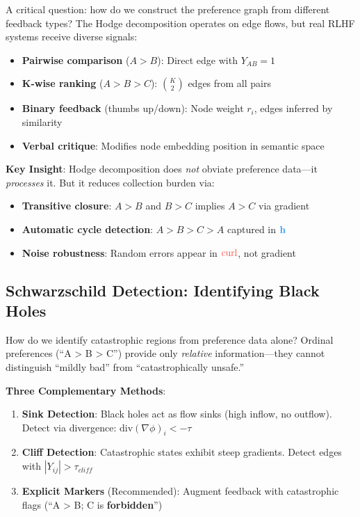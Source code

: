 \documentclass{article}
\begin{document}
A critical question: how do we construct the preference graph from different feedback types? The Hodge decomposition operates on edge flows, but real RLHF systems receive diverse signals:

\begin{itemize}[leftmargin=*]
    \item \textbf{Pairwise comparison} ($A > B$): Direct edge with $Y_{AB} = 1$
    \item \textbf{K-wise ranking} ($A > B > C$): $\binom{K}{2}$ edges from all pairs
    \item \textbf{Binary feedback} (thumbs up/down): Node weight $r_i$, edges inferred by similarity
    \item \textbf{Verbal critique}: Modifies node embedding position in semantic space
\end{itemize}

\textbf{Key Insight}: Hodge decomposition does \emph{not} obviate preference data---it \emph{processes} it. But it reduces collection burden via:
\begin{itemize}[leftmargin=*]
    \item \textbf{Transitive closure}: $A > B$ and $B > C$ implies $A > C$ via gradient
    \item \textbf{Automatic cycle detection}: $A > B > C > A$ captured in $\textcolor{harmcolor}{\mathbf{h}}$
    \item \textbf{Noise robustness}: Random errors appear in $\textcolor{curlcolor}{\text{curl}}$, not gradient
\end{itemize}

\subsection{Schwarzschild Detection: Identifying Black Holes}

How do we identify catastrophic regions from preference data alone? Ordinal preferences (``A > B > C'') provide only \emph{relative} information---they cannot distinguish ``mildly bad'' from ``catastrophically unsafe.''

\textbf{Three Complementary Methods}:

\begin{enumerate}[leftmargin=*]
    \item \textbf{Sink Detection}: Black holes act as flow sinks (high inflow, no outflow). Detect via divergence: $\text{div}(\nabla\phi)_i < -\tau$
    
    \item \textbf{Cliff Detection}: Catastrophic states exhibit steep gradients. Detect edges with $|Y_{ij}| > \tau_{cliff}$
    
    \item \textbf{Explicit Markers} (Recommended): Augment feedback with catastrophic flags (``A > B; C is \textbf{forbidden}'')
\end{enumerate}
\end{document}
